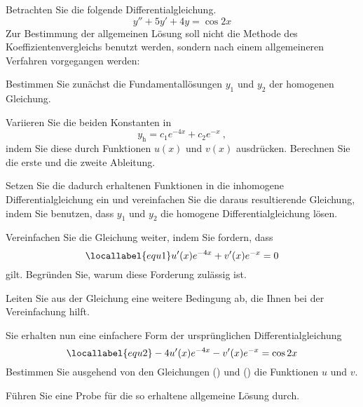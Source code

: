 \begin{atiTask}[
  title = Die Variation der Konstanten
]
  Betrachten Sie die folgende Differentialgleichung.
  \[
    y'' + 5y' + 4y = \cos 2x
  \]
  Zur Bestimmung der allgemeinen Lösung soll nicht die Methode des Koeffizientenvergleichs benutzt werden, sondern nach einem allgemeineren Verfahren vorgegangen werden:
  \begin{atiSubtasks}
    \item{
      Bestimmen Sie zunächst die Fundamentallösungen $y_1$ und $y_2$ der homogenen Gleichung.
    }
    \item{
      Variieren Sie die beiden Konstanten in
      \[
        y_\text{h} = c_1e^{-4x} + c_2e^{-x} \ ,
      \]
      indem Sie diese durch Funktionen $u(x)$ und $v(x)$ ausdrücken.
      Berechnen Sie die erste und die zweite Ableitung.
    }
    \item{
      Setzen Sie die dadurch erhaltenen Funktionen in die inhomogene Differentialgleichung ein und vereinfachen Sie die daraus resultierende Gleichung, indem Sie benutzen, dass $y_1$ und $y_2$ die homogene Differentialgleichung lösen.
    }
    \item{
      Vereinfachen Sie die Gleichung weiter, indem Sie fordern, dass
      \begin{equation}
        \locallabel{equ1}
        u'(x)e^{-4x} + v'(x)e^{-x} = 0
      \end{equation}
      gilt.
      Begründen Sie, warum diese Forderung zulässig ist.
    }
    \item{
      Leiten Sie aus der Gleichung  eine weitere Bedingung ab, die Ihnen bei der Vereinfachung hilft.
    }
    \item{
      Sie erhalten nun eine einfachere Form der ursprünglichen Differentialgleichung
      \begin{equation}
        \locallabel{equ2}
        -4u'(x)e^{-4x} - v'(x)e^{-x} = \cos 2x
      \end{equation}
      Bestimmen Sie ausgehend von den Gleichungen () und () die Funktionen $u$ und $v$.
    }
    \item{
      Führen Sie eine Probe für die so erhaltene allgemeine Lösung durch.
    }
  \end{atiSubtasks}
\end{atiTask}
